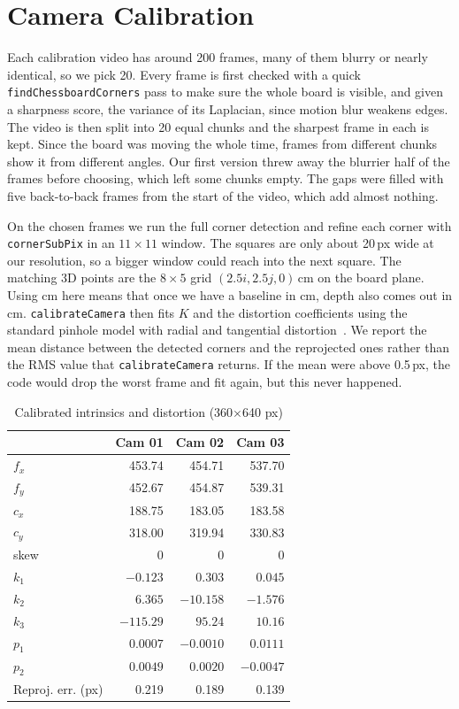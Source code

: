 \section{Camera Calibration}

Each calibration video has around 200 frames, many of them blurry or nearly identical, so we pick
20. Every frame is first checked with a quick \texttt{findChessboardCorners} pass to make sure the
whole board is visible, and given a sharpness score, the variance of its Laplacian, since motion
blur weakens edges. The video is then split into 20 equal chunks and the sharpest frame in each is
kept. Since the board was moving the whole time, frames from different chunks show it from different
angles. Our first version threw away the blurrier half of the frames before choosing, which left
some chunks empty. The gaps were filled with five back-to-back frames from the start of the video,
which add almost nothing.

On the chosen frames we run the full corner detection and refine each corner with
\texttt{cornerSubPix} in an $11\times11$ window. The squares are only about 20\,px wide at our
resolution, so a bigger window could reach into the next square. The matching 3D points are the
$8\times5$ grid $(2.5i, 2.5j, 0)$\,cm on the board plane. Using cm here means that once we have a
baseline in cm, depth also comes out in cm. \texttt{calibrateCamera} then fits $K$ and the
distortion coefficients using the standard pinhole model with radial and tangential
distortion~\cite{foundationsCVbook}. We report the mean distance between the detected corners and
the reprojected ones rather than the RMS value that \texttt{calibrateCamera} returns. If the mean
were above 0.5\,px, the code would drop the worst frame and fit again, but this never happened.

\begin{table}[t]
\caption{Calibrated intrinsics and distortion (360$\times$640 px)}
\label{tab:calib}
\centering
\setlength{\tabcolsep}{3pt}
\begin{tabular}{lrrr}
\hline
 & \textbf{Cam 01} & \textbf{Cam 02} & \textbf{Cam 03} \\
\hline
$f_x$ & 453.74 & 454.71 & 537.70 \\
$f_y$ & 452.67 & 454.87 & 539.31 \\
$c_x$ & 188.75 & 183.05 & 183.58 \\
$c_y$ & 318.00 & 319.94 & 330.83 \\
skew & 0 & 0 & 0 \\
\hline
$k_1$ & $-0.123$ & $0.303$ & $0.045$ \\
$k_2$ & $6.365$ & $-10.158$ & $-1.576$ \\
$k_3$ & $-115.29$ & $95.24$ & $10.16$ \\
$p_1$ & $0.0007$ & $-0.0010$ & $0.0111$ \\
$p_2$ & $0.0049$ & $0.0020$ & $-0.0047$ \\
\hline
Reproj. err. (px) & 0.219 & 0.189 & 0.139 \\
\hline
\end{tabular}
\end{table}

